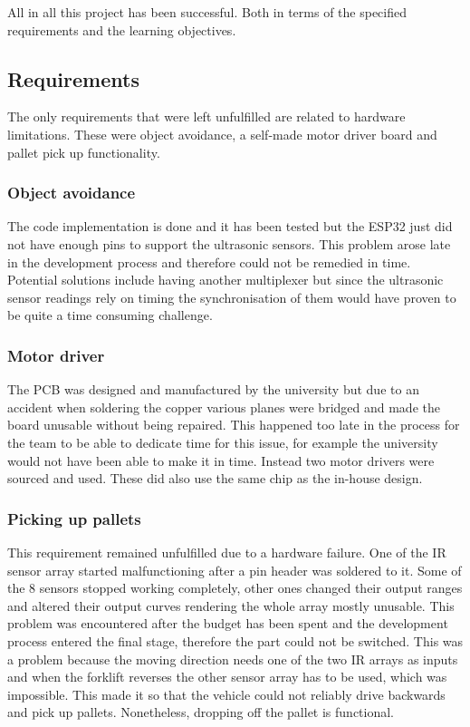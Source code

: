 \documentclass[report.tex]{subfiles}
\begin{document}
All in all this project has been successful. Both in terms of the specified requirements and the learning objectives.

\subsection{Requirements}

The only requirements that were left unfulfilled are related to hardware limitations.
These were object avoidance, a self-made motor driver board and pallet pick up functionality.

\subsubsection{Object avoidance}

The code implementation is done and it has been tested but the ESP32 just did not have enough pins to support the ultrasonic sensors.
This problem arose late in the development process and therefore could not be remedied in time. Potential solutions include having 
another multiplexer but since the ultrasonic sensor readings rely on timing the synchronisation of them would have proven to be 
quite a time consuming challenge.

\subsubsection{Motor driver}

The PCB was designed and manufactured by the university but due to an accident when soldering the copper various planes were bridged
and made the board unusable without being repaired. This happened too late in the process for the team to be able to dedicate 
time for this issue, for example the university would not have been able to make it in time.
Instead two motor drivers were sourced and used. These did also use the same chip as the in-house design. 

\subsubsection{Picking up pallets}

This requirement remained unfulfilled due to a hardware failure. One of the IR sensor array started malfunctioning 
after a pin header was soldered to it. Some of the 8 sensors stopped working completely, other ones changed their output
ranges and altered their output curves rendering the whole array mostly unusable. This problem was encountered after the 
budget has been spent and the development process entered the final stage, therefore the part could not be switched.
This was a problem because the moving direction needs one of the two IR arrays as inputs and when the forklift reverses
the other sensor array has to be used, which was impossible. This made it so that the vehicle could not reliably drive backwards
and pick up pallets. Nonetheless, dropping off the pallet is functional.
\end{document}
